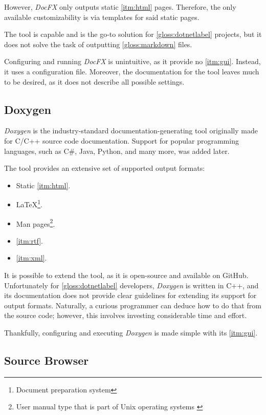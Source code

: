 However, \textit{DocFX} only outputs static \ref{itm:html} pages. Therefore, the only available customizability is via templates for said static pages.

The tool is capable and is the go-to solution for \ref{gloss:dotnetlabel} projects, but it does not solve the task of outputting \ref{gloss:markdown} files.

Configuring and running \textit{DocFX} is unintuitive, as it provide no \ref{itm:gui}. Instead, it uses a configuration file. Moreover, the documentation for the tool leaves much to be desired, as it does not describe all possible settings.

\subsection{Doxygen} \label{sec:doxygen}

\textit{Doxygen} is the industry-standard documentation-generating tool originally made for C/C++ source code documentation. Support for popular programming languages, such as C\#, Java, Python, and many more, was added later.

The tool provides an extensive set of supported output formats:
\begin{itemize}
    \item Static \ref{itm:html}.
    \item \LaTeX\footnote{Document preparation system}.
    \item Man pages\footnote{User manual type that is part of Unix operating systems \cite{credocs_limited_latex_2022}}.
    \item \ref{itm:rtf}.
    \item \ref{itm:xml}.
\end{itemize}

It is possible to extend the tool, as it is open-source and available on GitHub. Unfortunately for \ref{gloss:dotnetlabel} developers, \textit{Doxygen} is written in C++, and its documentation does not provide clear guidelines for extending its support for output formats. Naturally, a curious programmer can deduce how to do that from the source code; however, this involves investing considerable time and effort.

Thankfully, configuring and executing \textit{Doxygen} is made simple with its \ref{itm:gui}.

\subsection{Source Browser}

